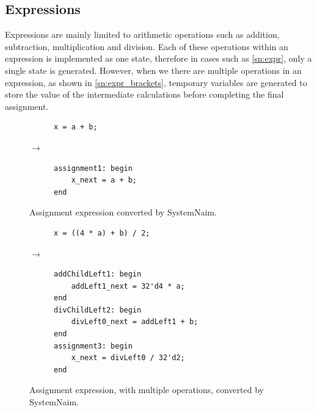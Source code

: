 \subsection{Expressions}

Expressions are mainly limited to arithmetic operations such as addition, subtraction, multiplication and division. Each of these operations within an expression is implemented as one state, therefore in cases such as \autoref{sn:expr}, only a single state is generated. However, when we there are multiple operations in an expression, as shown in \autoref{sn:expr_brackets}, temporary variables are generated to store the value of the intermediate calculations before completing the final assignment.

\begin{figure}[H]
\centering
\begin{subfigure}{0.2\textwidth}
    \centering
    \begin{verbatim}
x = a + b;
    \end{verbatim}
\end{subfigure}%
{\LARGE$\rightarrow$}%
\begin{subfigure}{0.3\textwidth}
    \begin{verbatim}
assignment1: begin
    x_next = a + b;
end
    \end{verbatim}
\end{subfigure}
\caption{Assignment expression converted by SystemNaim.}
\label{sn:expr}
\end{figure}

\begin{figure}[H]
\centering
\begin{subfigure}{0.35\textwidth}
    \centering
    \begin{verbatim}
x = ((4 * a) + b) / 2;
    \end{verbatim}
\end{subfigure}%
{\LARGE$\rightarrow$}%
\begin{subfigure}{0.47\textwidth}
    \begin{verbatim}
addChildLeft1: begin
    addLeft1_next = 32'd4 * a;
end
divChildLeft2: begin
    divLeft0_next = addLeft1 + b;
end
assignment3: begin
    x_next = divLeft0 / 32'd2;
end
    \end{verbatim}
\end{subfigure}
\caption{Assignment expression, with multiple operations, converted by SystemNaim.}
\label{sn:expr_brackets}
\end{figure}


